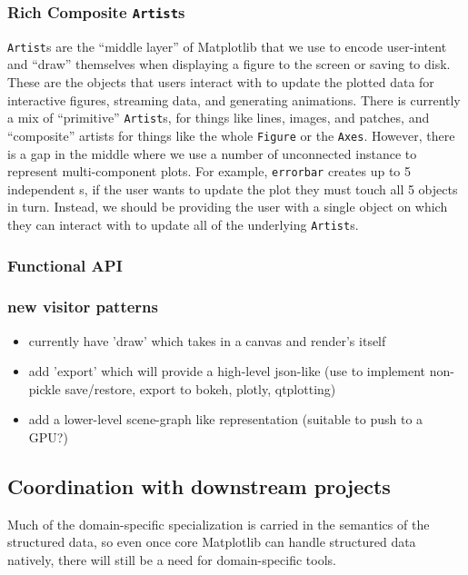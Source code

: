 \documentclass[11pt]{article}  %
\begin{document}
\subsubsection{Rich Composite \texttt{Artist}s}
\texttt{Artist}s are the ``middle layer'' of Matplotlib that we use to
encode user-intent and ``draw'' themselves when displaying a figure to
the screen or saving to disk.  These are the objects that users
interact with to update the plotted data for interactive figures,
streaming data, and generating animations.  There is currently a mix
of ``primitive'' \texttt{Artist}s, for things like lines, images, and
patches, and ``composite'' artists for things like the whole
\texttt{Figure} or the \texttt{Axes}.  However, there is a gap in the
middle where we use a number of unconnected  instance
to represent multi-component plots.  For example, \texttt{errorbar}
creates up to 5 independent s, if the user wants to
update the plot they must touch all 5 objects in turn.  Instead, we
should be providing the user with a single object on which they can
interact with to update all of the underlying \texttt{Artist}s.


\subsubsection{Functional API}






\subsubsection{new visitor patterns}

\begin{itemize}
\item currently have 'draw' which takes in a canvas and render's itself
\item add 'export' which will provide a high-level json-like (use to
  implement non-pickle save/restore, export to {bokeh, plotly,
    qtplotting})
\item add a lower-level scene-graph like representation (suitable to push to a GPU?)
\end{itemize}


\subsection{Coordination with downstream projects}

Much of the domain-specific specialization is carried in the semantics
of the structured data, so even once core Matplotlib can handle structured
data natively, there will still be a need for domain-specific tools.
\end{document}
